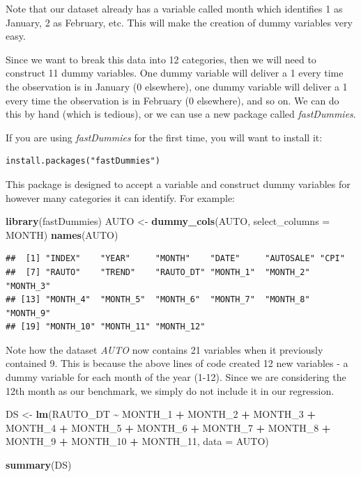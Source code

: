 \documentclass[
]{book}
\newenvironment{Shaded}{\begin{snugshade}}{\end{snugshade}}
\newcommand{\AttributeTok}[1]{\textcolor[rgb]{0.13,0.29,0.53}{#1}}
\newcommand{\FunctionTok}[1]{\textcolor[rgb]{0.13,0.29,0.53}{\textbf{#1}}}
\newcommand{\NormalTok}[1]{#1}
\newcommand{\OtherTok}[1]{\textcolor[rgb]{0.56,0.35,0.01}{#1}}
\newcommand{\SpecialCharTok}[1]{\textcolor[rgb]{0.81,0.36,0.00}{\textbf{#1}}}
\newcommand{\StringTok}[1]{\textcolor[rgb]{0.31,0.60,0.02}{#1}}
\begin{document}
Note that our dataset already has a variable called month which identifies 1 as January, 2 as February, etc. This will make the creation of dummy variables very easy.

Since we want to break this data into 12 categories, then we will need to construct 11 dummy variables. One dummy variable will deliver a 1 every time the observation is in January (0 elsewhere), one dummy variable will deliver a 1 every time the observation is in February (0 elsewhere), and so on. We can do this by hand (which is tedious), or we can use a new package called \emph{fastDummies}.

If you are using \emph{fastDummies} for the first time, you will want to install it:

\begin{verbatim}
install.packages("fastDummies")
\end{verbatim}

This package is designed to accept a variable and construct dummy variables for however many categories it can identify. For example:

\begin{Shaded}
\begin{Highlighting}[]
\FunctionTok{library}\NormalTok{(fastDummies)}
\NormalTok{AUTO }\OtherTok{\textless{}{-}} \FunctionTok{dummy\_cols}\NormalTok{(AUTO, }\AttributeTok{select\_columns =} \StringTok{\textquotesingle{}MONTH\textquotesingle{}}\NormalTok{)}
\FunctionTok{names}\NormalTok{(AUTO)}
\end{Highlighting}
\end{Shaded}

\begin{verbatim}
##  [1] "INDEX"    "YEAR"     "MONTH"    "DATE"     "AUTOSALE" "CPI"     
##  [7] "RAUTO"    "TREND"    "RAUTO_DT" "MONTH_1"  "MONTH_2"  "MONTH_3" 
## [13] "MONTH_4"  "MONTH_5"  "MONTH_6"  "MONTH_7"  "MONTH_8"  "MONTH_9" 
## [19] "MONTH_10" "MONTH_11" "MONTH_12"
\end{verbatim}

Note how the dataset \emph{AUTO} now contains 21 variables when it previously contained 9. This is because the above lines of code created 12 new variables - a dummy variable for each month of the year (1-12). Since we are considering the 12th month as our benchmark, we simply do not include it in our regression.

\begin{Shaded}
\begin{Highlighting}[]
\NormalTok{DS }\OtherTok{\textless{}{-}} \FunctionTok{lm}\NormalTok{(RAUTO\_DT }\SpecialCharTok{\textasciitilde{}}\NormalTok{ MONTH\_1 }\SpecialCharTok{+}\NormalTok{ MONTH\_2 }\SpecialCharTok{+}\NormalTok{ MONTH\_3 }\SpecialCharTok{+}\NormalTok{ MONTH\_4 }\SpecialCharTok{+}
\NormalTok{           MONTH\_5 }\SpecialCharTok{+}\NormalTok{ MONTH\_6 }\SpecialCharTok{+}\NormalTok{ MONTH\_7 }\SpecialCharTok{+}\NormalTok{ MONTH\_8 }\SpecialCharTok{+}\NormalTok{ MONTH\_9 }\SpecialCharTok{+}
\NormalTok{           MONTH\_10 }\SpecialCharTok{+}\NormalTok{ MONTH\_11, }\AttributeTok{data =}\NormalTok{ AUTO)}

\FunctionTok{summary}\NormalTok{(DS)}
\end{Highlighting}
\end{Shaded}
\end{document}
